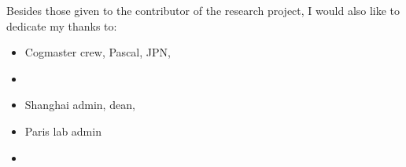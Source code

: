 \begin{acknowledgements}
    \addchaptertocentry{\acknowledgementname} %
    Besides those given to the contributor of the research project, I would also like to dedicate my thanks to: 
    \begin{itemize}
        \item Cogmaster crew, Pascal, JPN, 
        \item 
        \item Shanghai admin, dean, 
        \item Paris lab admin 
        \item 
    \end{itemize}
    \end{acknowledgements}